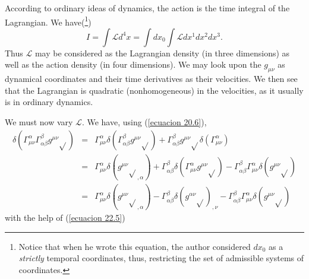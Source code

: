 According to ordinary ideas of dynamics, the action is the time integral of the Lagrangian. We have(\footnote{Notice 
that when he wrote this equation, the author considered $d x_0$ as a \emph{strictly} temporal coordinates, thus, 
restricting the set of admissible systems of coordinates.})
\[
 I = \int{\mathcal{L} d^4 x} = \int{ d x_0 \int{\mathcal{L} dx^1 dx^2 dx^3}}.
\]
Thus $\mathcal{L}$ may be considered as the Lagrangian density (in three dimensions) as well as the action density (in 
four dimensions). We may look upon the $g_{\mu\nu}$ as dynamical coordinates and their time derivatives as their 
velocities. We then see that the Lagrangian is quadratic (nonhomogeneous) in the velocities, as it usually is in 
ordinary dynamics.

We must now vary $\mathcal{L}$. We have, using (\ref{ecuacion 20.6}),
\begin{equation}
 \label{ecuacion 26.5}
 \begin{array}{rcl}
     \delta \left( \Gamma^\alpha_{\mu\nu} \Gamma^\beta_{\alpha\beta} g^{\mu\nu} \sqrt{}\right) & = &
     \Gamma^\alpha_{\mu\nu} \delta \left( \Gamma^\beta_{\alpha\beta} g^{\mu\nu} \sqrt{}\right) + 
     \Gamma^\beta_{\alpha\beta} g^{\mu\nu} \sqrt{}\delta \left( \Gamma^\alpha_{\mu\nu} \right)\\
     & = & \Gamma^\alpha_{\mu\nu} \delta\left( {g^{\mu\nu}\sqrt{}}_{,\alpha}\right)
        + \Gamma^\beta_{\alpha\beta} \delta\left( \Gamma^\alpha_{\mu\nu} g^{\mu\nu} \sqrt{} \right)
        - \Gamma^\beta_{\alpha\beta} \Gamma^\alpha_{\mu\nu} \delta\left( g^{\mu\nu} \sqrt{} \right)\\
     & = & \Gamma^\alpha_{\mu\nu} \delta\left( {g^{\mu\nu}\sqrt{}}_{,\alpha}\right)
        - \Gamma^\beta_{\alpha\beta} \delta\left(  g^{\alpha\nu} \sqrt{} \right)_{,\nu}
        - \Gamma^\beta_{\alpha\beta} \Gamma^\alpha_{\mu\nu} \delta\left( g^{\mu\nu} \sqrt{} \right)
 \end{array}
\end{equation}
with the help of (\ref{ecuacion 22.5})


